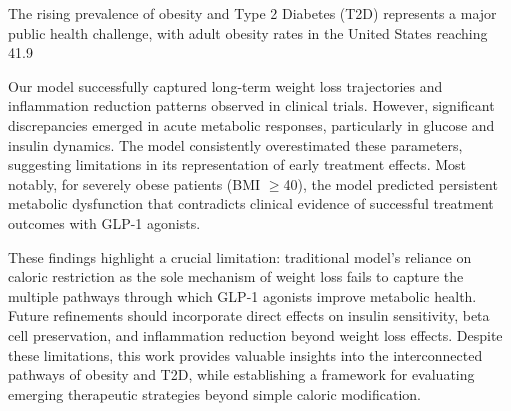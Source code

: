 The rising prevalence of obesity and Type 2 Diabetes (T2D) represents a major public health challenge, with adult obesity rates in the United States reaching 41.9%

Our model successfully captured long-term weight loss trajectories and inflammation reduction patterns observed in clinical trials. However, significant discrepancies emerged in acute metabolic responses, particularly in glucose and insulin dynamics. The model consistently overestimated these parameters, suggesting limitations in its representation of early treatment effects. Most notably, for severely obese patients (BMI $\geq$40), the model predicted persistent metabolic dysfunction that contradicts clinical evidence of successful treatment outcomes with GLP-1 agonists.

These findings highlight a crucial limitation: traditional model's reliance on caloric restriction as the sole mechanism of weight loss fails to capture the multiple pathways through which GLP-1 agonists improve metabolic health. Future refinements should incorporate direct effects on insulin sensitivity, beta cell preservation, and inflammation reduction beyond weight loss effects. Despite these limitations, this work provides valuable insights into the interconnected pathways of obesity and T2D, while establishing a framework for evaluating emerging therapeutic strategies beyond simple caloric modification.